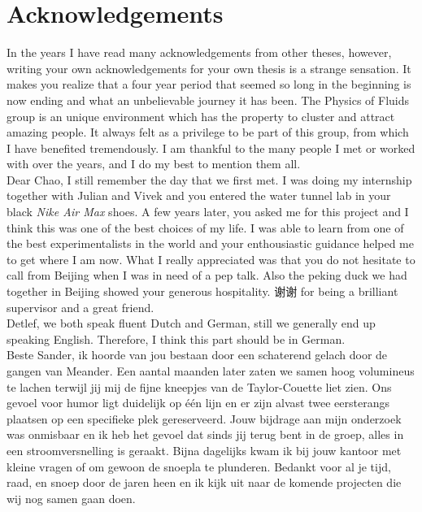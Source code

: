 \chapter{Acknowledgements}
\mf{\flagus}\indent In the years I have read many acknowledgements from other
theses, however, writing your own acknowledgements for your own thesis is a
strange sensation.  It makes you realize that a four year period that seemed
so long in the beginning is now ending and what an unbelievable journey it has
been.  The Physics of Fluids group is an unique environment which has the
property to cluster and attract amazing people.  It always felt as a privilege
to be part of this group, from which I have benefited tremendously.  I am
thankful to the many people I met or worked with over the years, and I do my
best to mention them all. \\
\mf{\flagus}\indent Dear Chao, I still remember the day that we first met. I
was doing my internship together with Julian and Vivek and you entered the
water tunnel lab in your black \emph{Nike Air Max} shoes.  A few years later,
you asked me for this project and I think this was one of the best choices of
my life. I was able to learn from one of the best experimentalists in the
world and your enthousiastic guidance helped me to get where I am now. What I
really appreciated was that you do not hesitate to call from Beijing when I
was in need of a pep talk. Also the peking duck we had together in Beijing
showed your generous hospitality. \mf{\flagcn} 谢谢 for being a brilliant
supervisor and a great friend.\\
\mf{\flagde}\indent Detlef, we both speak fluent Dutch and German, still we
generally end up speaking English. Therefore, I think this part should be in
German.\\
\mf{\flagnl}\indent Beste Sander, ik hoorde van jou bestaan door een
schaterend gelach door de gangen van Meander. Een aantal maanden later zaten
we samen hoog volumineus te lachen terwijl jij mij de fijne kneepjes van de
Taylor-Couette liet zien. Ons gevoel voor humor ligt duidelijk op \'e\'en lijn
en er zijn alvast twee eersterangs plaatsen op een specifieke plek gereserveerd.
Jouw bijdrage aan mijn onderzoek was onmisbaar en ik heb het gevoel dat sinds
jij terug bent in de groep, alles in een stroomversnelling is geraakt.
Bijna dagelijks kwam ik bij jouw kantoor met kleine vragen of om gewoon de
snoepla te plunderen. Bedankt voor al je tijd, raad, en snoep door de jaren
heen en ik kijk uit naar de komende projecten die wij nog samen gaan doen.\\
